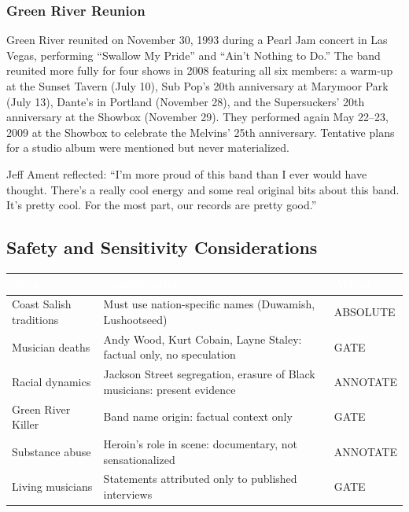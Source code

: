 \documentclass[11pt,letterpaper]{article}
\newcommand{\tableheader}[1]{\textbf{\sffamily\textcolor{white}{#1}}}
\begin{document}
\subsubsection{Green River Reunion}

Green River reunited on November 30, 1993 during a Pearl Jam concert in Las Vegas, performing ``Swallow My Pride'' and ``Ain't Nothing to Do.'' The band reunited more fully for four shows in 2008 featuring all six members: a warm-up at the Sunset Tavern (July 10), Sub Pop's 20th anniversary at Marymoor Park (July 13), Dante's in Portland (November 28), and the Supersuckers' 20th anniversary at the Showbox (November 29). They performed again May 22--23, 2009 at the Showbox to celebrate the Melvins' 25th anniversary. Tentative plans for a studio album were mentioned but never materialized.

Jeff Ament reflected: ``I'm more proud of this band than I ever would have thought. There's a really cool energy and some real original bits about this band. It's pretty cool. For the most part, our records are pretty good.''

\subsection{Safety and Sensitivity Considerations}

\begin{center}
\begin{tabularx}{\textwidth}{L{3.5cm}XC{2cm}}
\toprule
{}
\tableheader{Area} & \tableheader{Consideration} & \tableheader{Action} \\
\midrule
Coast Salish traditions & Must use nation-specific names (Duwamish, Lushootseed) & ABSOLUTE \\
Musician deaths & Andy Wood, Kurt Cobain, Layne Staley: factual only, no speculation & GATE \\
Racial dynamics & Jackson Street segregation, erasure of Black musicians: present evidence & ANNOTATE \\
Green River Killer & Band name origin: factual context only & GATE \\
Substance abuse & Heroin's role in scene: documentary, not sensationalized & ANNOTATE \\
Living musicians & Statements attributed only to published interviews & GATE \\
\bottomrule
\end{tabularx}
\end{center}
\end{document}
